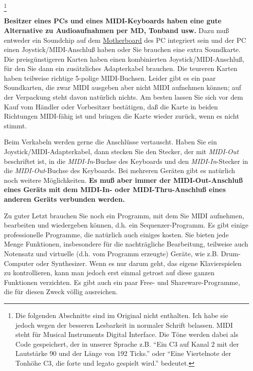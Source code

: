 \footnote{Die folgenden Abschnitte sind im Original nicht enthalten.
Ich habe sie jedoch wegen der besseren Lesbarkeit in normaler Schrift belassen.
MIDI steht für Musical Instruments Digital Interface. Die Töne werden dabei als Code gespeichert, der in unserer Sprache z.B. \enquote{Ein C3 auf Kanal 2 mit der Lautstärke 90 und der Länge von 192 Ticks.} oder \enquote{Eine Viertelnote der Tonhöhe C3, die forte und legato gespielt wird.} bedeutet.}


\textbf{Besitzer eines PCs und eines MIDI-Keyboards haben eine gute Alternative zu Audioaufnahmen per MD, Tonband usw.}
Dazu muß entweder ein Soundchip auf dem \hyperref[Motherboard]{Motherboard} des PC integriert sein und der PC einen Joystick/MIDI-Anschluß haben oder Sie brauchen eine extra Soundkarte.
Die preisgünstigeren Karten haben einen kombinierten Joystick/MIDI-Anschluß, für den Sie dann ein zusätzliches Adapterkabel brauchen.
Die teureren Karten haben teilweise richtige 5-polige MIDI-Buchsen.
Leider gibt es ein paar Soundkarten, die zwar MIDI ausgeben aber nicht MIDI aufnehmen können; auf der Verpackung steht davon natürlich nichts.
Am besten lassen Sie sich vor dem Kauf vom Händler oder Vorbesitzer bestätigen, daß die Karte in beiden Richtungen MIDI-fähig ist und bringen die Karte wieder zurück, wenn es nicht stimmt.

Beim Verkabeln werden gerne die Anschlüsse vertauscht.
Haben Sie ein Joystick/MIDI-Adapterkabel, dann stecken Sie den Stecker, der mit \textit{MIDI-Out} beschriftet ist, in die \textit{MIDI-In}-Buchse des Keyboards und den \textit{MIDI-In}-Stecker in die \textit{MIDI-Out}-Buchse des Keyboards.
Bei mehreren Geräten gibt es natürlich noch weitere Möglichkeiten.
\textbf{Es muß aber immer der MIDI-Out-Anschluß eines Geräts mit dem MIDI-In- oder MIDI-Thru-Anschluß eines anderen Geräts verbunden werden.}

Zu guter Letzt brauchen Sie noch ein Programm, mit dem Sie MIDI aufnehmen, bearbeiten und wiedergeben können, d.h. ein Sequenzer-Programm.
Es gibt einige professionelle Programme, die natürlich auch einiges kosten.
Sie bieten jede Menge Funktionen, insbesondere für die nachträgliche Bearbeitung, teilweise auch Notensatz und virtuelle (d.h. vom Programm erzeugte) Geräte, wie z.B. Drum-Computer oder Synthesizer.
Wenn es nur darum geht, das eigene Klavierspielen zu kontrollieren, kann man jedoch erst einmal getrost auf diese ganzen Funktionen verzichten.
Es gibt auch ein paar Free- und Shareware-Programme, die für diesen Zweck völlig ausreichen.

